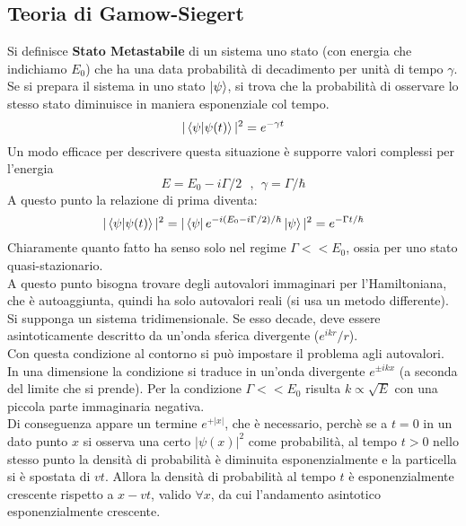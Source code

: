 \documentclass[twoside]{article}
\begin{document}
\subsection{Teoria di Gamow-Siegert}
Si definisce \textbf{Stato Metastabile} di un sistema uno stato (con energia  che indichiamo $E_0$) che ha una data probabilità di decadimento per unità di tempo $\gamma$.
\\
Se si prepara il sistema in uno stato $\ket{\psi}$, si trova che la probabilità di osservare lo stesso stato diminuisce in maniera esponenziale col tempo.
\begin{equation}
    |\bra{\psi}\ket{\psi(t)}|^2=e^{-\gamma t}
\end{equation}
Un modo efficace per descrivere questa situazione è supporre valori complessi per l'energia
\begin{equation}
    E=E_0 - i\Gamma/2 \ \ \ , \ \ \gamma=\Gamma/\hbar
\end{equation}
A questo punto la relazione di prima diventa:
\begin{equation}
    |\bra{\psi}\ket{\psi(t)}|^2=|\bra{\psi}e^{-i(E_0 - i\Gamma/2)/\hbar}\ket{\psi}|^2=e^{-\Gamma t /\hbar}
\end{equation}
Chiaramente quanto fatto ha senso solo nel regime $\Gamma << E_0$, ossia per uno stato quasi-stazionario.
\\
A questo punto bisogna trovare degli autovalori immaginari per l'Hamiltoniana, che è autoaggiunta, quindi ha solo autovalori reali (si usa un metodo differente).
\\
Si supponga un sistema tridimensionale.
Se esso decade, deve essere asintoticamente descritto da un'onda sferica divergente ($e^{ikr}/r$).
\\
Con questa condizione al contorno si può impostare il problema agli autovalori.
\\
In una dimensione la condizione si traduce in un'onda divergente $e^{\pm ikx}$ (a seconda del limite che si prende). Per la condizione $\Gamma << E_0$ risulta $k\propto\sqrt{E}$ con una piccola parte immaginaria negativa.
\\
Di conseguenza appare un termine $e^{+|x|}$, che è necessario, perchè se a $t=0$ in un dato punto $x$ si osserva una certo $|\psi(x)|^2$ come probabilità, al tempo $t>0$ nello stesso punto la densità di probabilità è diminuita esponenzialmente e la particella si è spostata di $vt$.
Allora la densità di probabilità al tempo $t$ è esponenzialmente crescente rispetto a $x-vt$, valido $\forall x$, da cui l'andamento asintotico esponenzialmente crescente.
\end{document}
